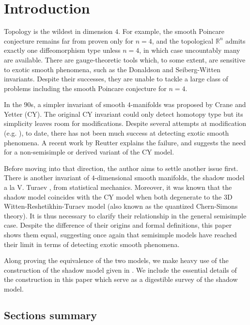 \section{Introduction}

Topology is the wildest in dimension $4$. For example, the smooth
Poincare conjecture remains far from proven only for $n = 4$, and
the topological $\mathbb{R}^{n}$ admits exactly one
diffeomorphism type unless $n=4$, in which case uncountably many
are available. There are gauge-theoretic tools which, to some
extent, are sensitive to exotic smooth phenomena, such as the
Donaldson and Seiberg-Witten invariants. Despite their successes,
they are unable to tackle a large class of problems including the
smooth Poincare conjecture for $n=4$.

In the $90$s, a simpler invariant of smooth $4$-manifolds was
proposed by Crane and Yetter (CY). The original CY invariant
could only detect homotopy type but its simplicity leaves room
for modifications. Despite several attempts at modification (e.g.
\cite{barenz/evaluation-crane-yetter}), to date, there has not been
much success at detecting exotic smooth phenomena. A recent work
by Reutter \cite{reutter/semisimple} explains the failure, and
suggests the need for a non-semisimple or derived variant of the
CY model.

Before moving into that direction, the author aims to settle
another issue first. There is another invariant of
$4$-dimensional smooth manifolds, the shadow model a la V. Turaev
\cite{turaev/topology-of-shadows} \cite{turaev-qiok-3-manifolds},
from statistical mechanics. Moreover, it was known that the
shadow model coincides with the CY model when both degenerate
\cite[X.3.2 \& theorem X.3.3]{turaev-qiok-3-manifolds}
\cite{barrett/observables-in-tv-and-cy} to the $3$D
Witten-Reshetikhin-Turaev model (also known as the quantized
Chern-Simons theory). It is thus necessary to clarify their
relationship in the general semisimple case. Despite the
difference of their origins and formal definitions, this paper
shows them equal, suggesting once again that semisimple models
have reached their limit in terms of detecting exotic smooth
phenomena.

Along proving the equivalence of the two models, we make heavy
use of the construction of the shadow model given in
\cite{turaev-qiok-3-manifolds}. We include the essential details
of the construction in this paper which serve as a digestible
survey of the shadow model.

\subsection{Sections summary}

